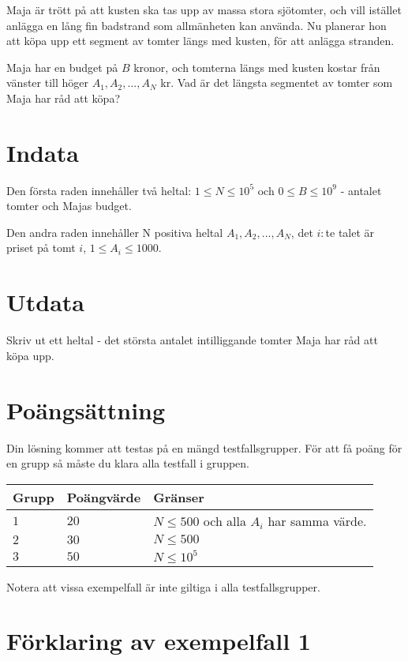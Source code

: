 Maja är trött på att kusten ska tas upp av massa stora sjötomter, och vill istället anlägga en lång fin badstrand som allmänheten kan använda.
Nu planerar hon att köpa upp ett segment av tomter längs med kusten, för att anlägga stranden.

Maja har en budget på $B$ kronor, och tomterna längs med kusten kostar från vänster till höger $A_1,A_2,...,A_N$ kr.
Vad är det längsta segmentet av tomter som Maja har råd att köpa?

\section*{Indata}
Den första raden innehåller två heltal: $1\leq N \leq 10^5$ och $0 \leq B \leq 10^9$ - antalet tomter och Majas budget.

Den andra raden innehåller N positiva heltal $A_1,A_2,...,A_N$, det $i:$te talet är priset på tomt $i$, $1\le A_i \le 1000$.


\section*{Utdata}
Skriv ut ett heltal - det största antalet intilliggande tomter Maja har råd att köpa upp.

\section*{Poängsättning}
Din lösning kommer att testas på en mängd testfallsgrupper.
För att få poäng för en grupp så måste du klara alla testfall i gruppen.

\noindent
\begin{tabular}{| l | l | p{12cm} |}
  \hline
  Grupp & Poängvärde & Gränser \\ \hline
  $1$   & $20$       & $N \leq 500 $ och alla $A_i$ har samma värde.\\ \hline
  $2$   & $30$       & $N \leq 500 $\\ \hline
  $3$   & $50$       & $N \leq 10^5 $  \\ \hline
\end{tabular}

Notera att vissa exempelfall är inte giltiga i alla testfallsgrupper.

\section*{Förklaring av exempelfall 1}
